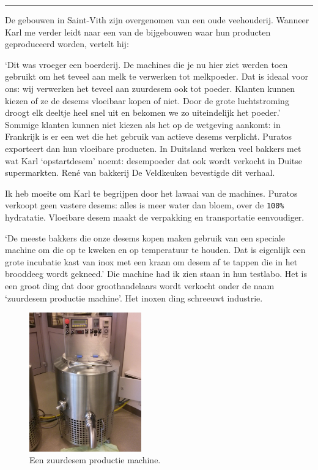 \documentclass[
  11pt,
  dutch,
]{memoir}
\begin{document}
\pfbreak

De gebouwen in Saint-Vith zijn overgenomen van een oude veehouderij.
Wanneer Karl me verder leidt naar een van de bijgebouwen waar hun
producten geproduceerd worden, vertelt hij:

`Dit was vroeger een boerderij. De machines die je nu hier ziet werden
toen gebruikt om het teveel aan melk te verwerken tot melkpoeder. Dat is
ideaal voor ons: wij verwerken het teveel aan zuurdesem ook tot poeder.
Klanten kunnen kiezen of ze de desems vloeibaar kopen of niet. Door de
grote luchtstroming droogt elk deeltje heel snel uit en bekomen we zo
uiteindelijk het poeder.' Sommige klanten kunnen niet kiezen als het op
de wetgeving aankomt: in Frankrijk is er een wet die het gebruik van
actieve desems verplicht. Puratos exporteert dan hun vloeibare
producten. In Duitsland werken veel bakkers met wat Karl `opstartdesem'
noemt: desempoeder dat ook wordt verkocht in Duitse supermarkten. René
van bakkerij De Veldkeuken bevestigde dit verhaal.

Ik heb moeite om Karl te begrijpen door het lawaai van de machines.
Puratos verkoopt geen vastere desems: alles is meer water dan bloem,
over de \texttt{100\%} hydratatie. Vloeibare desem maakt de verpakking
en transportatie eenvoudiger.

`De meeste bakkers die onze desems kopen maken gebruik van een speciale
machine om die op te kweken en op temperatuur te houden. Dat is
eigenlijk een grote incubatie kast van inox met een kraan om desem af te
tappen die in het brooddeeg wordt gekneed.' Die machine had ik zien
staan in hun testlabo. Het is een groot ding dat door groothandelaars
wordt verkocht onder de naam `zuurdesem productie machine'. Het inoxen
ding schreeuwt industrie.

\begin{figure}
    \includegraphics[height=6cm]{img/bw/sdmachine.jpg}
    \caption{Een zuurdesem productie machine.}
\end{figure}
\end{document}
